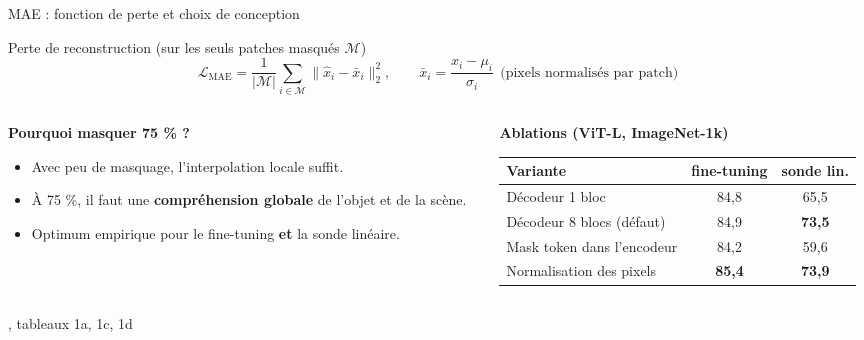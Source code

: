 \documentclass[aspectratio=169,10pt]{beamer}
\newcommand{\src}[1]{\par\vfill\hfill{\tiny\color{grisE}#1}}
\begin{document}
\begin{frame}{MAE : fonction de perte et choix de conception}
  \begin{block}{Perte de reconstruction (sur les seuls patches masqués $\mathcal{M}$)}
    \[
      \mathcal{L}_{\text{MAE}} = \frac{1}{|\mathcal{M}|}\sum_{i\in\mathcal{M}} \big\| \hat{x}_i - \bar{x}_i \big\|_2^2,
      \qquad \bar{x}_i = \frac{x_i - \mu_i}{\sigma_i}\ \ \text{(pixels normalisés par patch)}
    \]
  \end{block}
  \begin{columns}[T]
    \begin{column}{0.5\textwidth}
      \textbf{Pourquoi masquer 75 \% ?}
      \begin{itemize}\small
        \item Avec peu de masquage, l'interpolation locale suffit.
        \item À 75 \%, il faut une \textbf{compréhension globale} de l'objet et de la scène.
        \item Optimum empirique pour le fine-tuning \textbf{et} la sonde linéaire.
      \end{itemize}
    \end{column}
    \begin{column}{0.47\textwidth}
      \footnotesize
      \textbf{Ablations (ViT-L, ImageNet-1k)}\\[1mm]
      \begin{tabular}{@{}l c c@{}}
        \toprule
        Variante & fine-tuning & sonde lin.\\
        \midrule
        Décodeur 1 bloc & 84,8 & 65,5\\
        Décodeur 8 blocs (défaut) & 84,9 & \textbf{73,5}\\
        Mask token dans l'encodeur & 84,2 & 59,6\\
        Normalisation des pixels & \textbf{85,4} & \textbf{73,9}\\
        \bottomrule
      \end{tabular}
    \end{column}
  \end{columns}
  \src{\citet{he2022mae}, tableaux 1a, 1c, 1d}
\end{frame}
\end{document}
